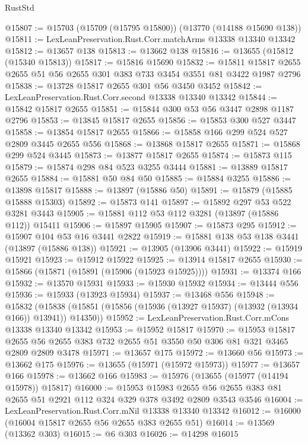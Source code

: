 \begin{lexlean}{RustStd}
\begin{coremodule}
@15807 := @15703 (@15709 (@15795 @15800)) (@13770 (@14188 @15690 @138))
@15811 := LexLeanPreservation.Rust.Corr.matchArms @13338 @13340 @13342
@15812 := @13657 @138
@15813 := @13662 @138
@15816 := @13655 (@15812 (@15340 @15813))
@15817 := @15816 @15690
@15832 := @15811 @15817 @2655 @2655 @51 @56 @2655 @301 @383 @733 @3454 @3551 @81 @3422 @1987 @2796
@15838 := @13728 @15817 @2655 @301 @56 @3450 @3452
@15842 := LexLeanPreservation.Rust.Corr.second @13338 @13340 @13342
@15844 := @15842 @15817 @2655
@15851 := @15844 @300 @53 @56 @3447 @2898 @1187 @2796
@15853 := @13845 @15817 @2655
@15856 := @15853 @300 @527 @3447
@15858 := @13854 @15817 @2655
@15866 := @15858 @166 @299 @524 @527 @2809 @3445 @2655 @556
@15868 := @13868 @15817 @2655
@15871 := @15868 @299 @524 @3445
@15873 := @13877 @15817 @2655
@15874 := @15873 @115
@15879 := @15874 @298 @84 @523 @3255 @3444
@15881 := @13889 @15817 @2655
@15884 := @15881 @50 @84 @50
@15885 := @15884 @3255
@15886 := @13898 @15817
@15888 := @13897 (@15886 @50)
@15891 := @15879 (@15885 @15888 @15303)
@15892 := @15873 @141
@15897 := @15892 @297 @53 @522 @3281 @3443
@15905 := @15881 @112 @53 @112 @3281 (@13897 (@15886 @112)) @15411
@15906 := @15897 @15905
@15907 := @15873 @295
@15912 := @15907 @104 @53 @16 @3441 @2822
@15919 := @15881 @138 @53 @138 @3441 (@13897 (@15886 @138))
@15921 := @13905 (@13906 @3441)
@15922 := @15919 @15921
@15923 := @15912 @15922
@15925 := @13914 @15817 @2655
@15930 := @15866 (@15871 (@15891 (@15906 (@15923 @15925))))
@15931 := @13374 @166
@15932 := @13570 @15931
@15933 := @15930 @15932
@15934 := @13444 @556
@15936 := @15933 (@13923 @15934)
@15937 := @13468 @556
@15948 := @15832
    (@15838 (@15851 (@15856 (@15936 (@13927 @15937) (@13932 (@13934 @166)) @13941)) @14350))
@15952 := LexLeanPreservation.Rust.Corr.mCons @13338 @13340 @13342
@15953 := @15952 @15817
@15970 := @15953
    @15817
    @2655
    @56
    @2655
    @383
    @732
    @2655
    @51
    @3550
    @50
    @306
    @81
    @321
    @3465
    @2809
    @2809
    @3478
@15971 := @13657 @175
@15972 := @13660 @56
@15973 := @13662 @175
@15976 := @13655 (@15971 (@15972 @15973))
@15977 := @13657 @166
@15978 := @13662 @166
@15983 := @15976 (@13655 (@15977 (@14194 @15978)) @15817)
@16000 := @15953
    @15983
    @2655
    @56
    @2655
    @383
    @81
    @2655
    @51
    @2921
    @112
    @324
    @329
    @378
    @3492
    @2809
    @3543
    @3546
@16004 := LexLeanPreservation.Rust.Corr.mNil @13338 @13340 @13342
@16012 := @16000 (@16004 @15817 @2655 @56 @2655 @383 @2655 @51)
@16014 := @13569 (@13362 @303)
@16015 := @6 @303
@16026 := @14298
    @16015

\end{coremodule}
\end{lexlean}
